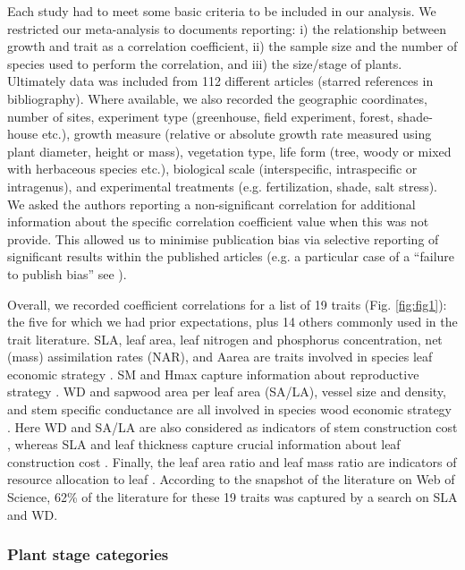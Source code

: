 \documentclass[a4paper,11pt]{article}
\begin{document}
Each study had to meet some basic criteria to be included in our analysis. We restricted our meta-analysis to documents reporting: i) the relationship between growth and trait as a correlation coefficient, ii) the sample size and the number of species used to perform the correlation, and iii) the size/stage of plants. Ultimately data was included from 112 different articles (starred references in bibliography). Where available, we also recorded the geographic coordinates, number of sites, experiment type (greenhouse, field experiment, forest, shade-house etc.), growth measure (relative or absolute growth rate measured using plant diameter, height or mass), vegetation type, life form (tree, woody or mixed with herbaceous species etc.), biological scale (interspecific, intraspecific or intragenus), and experimental treatments (e.g. fertilization, shade, salt stress).  We asked the authors reporting a non-significant correlation for additional information about the specific correlation coefficient value when this was not provide. This allowed us to minimise publication bias via selective reporting of significant results within the published articles (e.g. a particular case of a ``failure to publish bias'' see \citealt{Jennions:2013ta}).

Overall, we recorded coefficient correlations for a list of 19 traits (Fig. \ref{fig:fig1}): the five for which we had prior expectations, plus 14 others commonly used in the trait literature. SLA, leaf area, leaf nitrogen and phosphorus concentration, net (mass) assimilation rates (NAR), and Aarea are traits involved in species leaf economic strategy \citep{Wright:2004jb,Wright:2010tp}. SM and Hmax capture information about reproductive strategy \citep{Falster:2005bw,Moles:2006ft}. WD and sapwood area per leaf area (SA/LA), vessel size and density, and stem specific conductance are all involved in species wood economic strategy  \citep{Chave:2009iy}. Here WD and SA/LA are also considered as indicators of stem construction cost \citep{Falster:2011ii}, whereas SLA and leaf thickness capture crucial information about leaf construction cost \citep{Wright:2004jb}. Finally, the leaf area ratio and leaf mass ratio are indicators of resource allocation to leaf \citep{Lambers:1992bj}. According to the snapshot of the literature on Web of Science, 62\% of the literature for these 19 traits was captured by a search on SLA and WD.

\subsubsection*{Plant stage categories}\label{plant-stage-categories}
\end{document}
